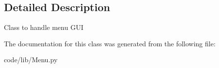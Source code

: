 \subsection{Detailed Description}
\begin{DoxyVerb}Class to handle menu GUI
\end{DoxyVerb}
 

The documentation for this class was generated from the following file\+:\begin{DoxyCompactItemize}
\item 
code/lib/Menu.\+py\end{DoxyCompactItemize}
